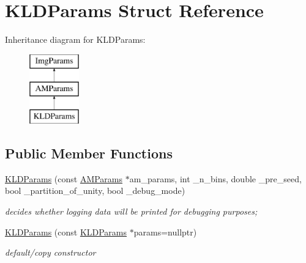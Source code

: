 \hypertarget{structKLDParams}{\section{K\-L\-D\-Params Struct Reference}
\label{structKLDParams}
}
Inheritance diagram for K\-L\-D\-Params\-:\begin{figure}[H]
\begin{center}
\leavevmode
\includegraphics[height=3.000000cm]{structKLDParams}
\end{center}
\end{figure}
\subsection*{Public Member Functions}
\begin{DoxyCompactItemize}
\item 
\hyperlink{structKLDParams_a1a9a0256a98714fcfe8bdc691bce2ce1}{K\-L\-D\-Params} (const \hyperlink{structAMParams}{A\-M\-Params} $\ast$am\-\_\-params, int \-\_\-n\-\_\-bins, double \-\_\-pre\-\_\-seed, bool \-\_\-partition\-\_\-of\-\_\-unity, bool \-\_\-debug\-\_\-mode)
\begin{DoxyCompactList}\small\item\em decides whether logging data will be printed for debugging purposes; \end{DoxyCompactList}\item 
\hypertarget{structKLDParams_ab8912d7579d8b221ad839b31f7f19e29}{\hyperlink{structKLDParams_ab8912d7579d8b221ad839b31f7f19e29}{K\-L\-D\-Params} (const \hyperlink{structKLDParams}{K\-L\-D\-Params} $\ast$params=nullptr)}\label{structKLDParams_ab8912d7579d8b221ad839b31f7f19e29}

\begin{DoxyCompactList}\small\item\em default/copy constructor \end{DoxyCompactList}\end{DoxyCompactItemize}
